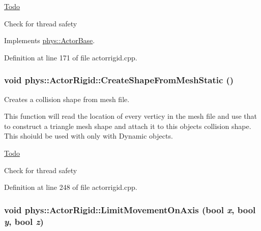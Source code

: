 \begin{Desc}
\item[\hyperlink{todo__todo000002}{Todo}]
\begin{DoxyItemize}
\item Check for thread safety 
\end{DoxyItemize}\end{Desc}




Implements \hyperlink{classphys_1_1ActorBase_aa41370f6d2031a9dad8df45bd7f3bcc6}{phys::ActorBase}.



Definition at line 171 of file actorrigid.cpp.

\hypertarget{classphys_1_1ActorRigid_a84554dcaaf2475ba0ec7dcb9235050ac}{
\subsubsection[{CreateShapeFromMeshStatic}]{\setlength{\rightskip}{0pt plus 5cm}void phys::ActorRigid::CreateShapeFromMeshStatic ()}}
\label{d8/d71/classphys_1_1ActorRigid_a84554dcaaf2475ba0ec7dcb9235050ac}


Creates a collision shape from mesh file. 

This function will read the location of every verticy in the mesh file and use that to construct a triangle mesh shape and attach it to this objects collision shape. This shoiuld be used with only with Dynamic objects. 

\begin{Desc}
\item[\hyperlink{todo__todo000003}{Todo}]
\begin{DoxyItemize}
\item Check for thread safety 
\end{DoxyItemize}\end{Desc}




Definition at line 248 of file actorrigid.cpp.

\hypertarget{classphys_1_1ActorRigid_adaed962ee8ed788612e541fb00867c78}{
\subsubsection[{LimitMovementOnAxis}]{\setlength{\rightskip}{0pt plus 5cm}void phys::ActorRigid::LimitMovementOnAxis (bool {\em x}, \/  bool {\em y}, \/  bool {\em z})}}
\label{d8/d71/classphys_1_1ActorRigid_adaed962ee8ed788612e541fb00867c78}


